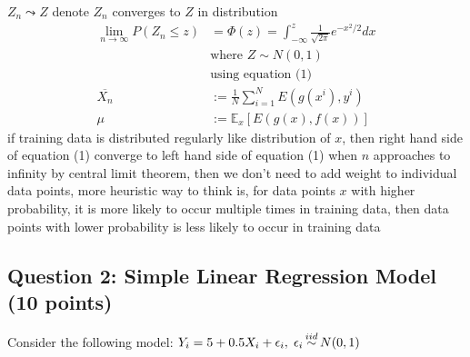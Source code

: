 \documentclass{article}
\newcommand\iidsim{\stackrel{\mathclap{iid}}{\sim}}
\begin{document}
$Z_n \leadsto Z$ denote $Z_n$ converges to $Z$ in distribution
\begin{align*}
\lim_{n \rightarrow \infty} P(Z_n \leq z) &= \Phi(z) = \int_{-\infty} ^ z \frac{1}{\sqrt{2\pi}} e ^ {-x ^ 2 / 2} dx\\
&\text{where } Z \sim N(0, 1)\\
&\text{using equation (1)}\\
\overline{X_n} &:= \frac{1}{N} \sum_{i=1}^N E(g(x^i), y^i)\\
\mu &:= \mathbb{E}_{x}\left[E(g(x), f(x))\right]
\end{align*}
if training data is distributed regularly like distribution of $x$, then right hand side of equation (1) converge to left hand side of equation (1) when $n$ approaches to infinity by central limit theorem, then we don't need to add weight to individual data points, more heuristic way to think is, for data points $x$ with higher probability, it is more likely to occur multiple times in training data, then data points with lower probability is less likely to occur in training data

\subsection*{Question 2: 
Simple Linear Regression Model (10 points)}

Consider the following model: $Y_{i} = 5 + 0.5X_{i} + \epsilon_{i}, \hspace{1mm} \epsilon_{i} \iidsim N(0,1)$
\end{document}
